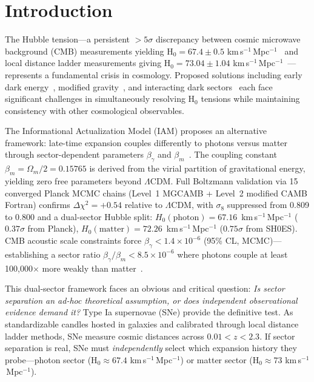 \documentclass[twocolumn,superscriptaddress,prd,amsmath,amssymb]{revtex4-2}
\begin{document}
\section{Introduction}

The Hubble tension—a persistent $>5\sigma$ discrepancy between cosmic microwave background (CMB) measurements yielding H$_0 = 67.4 \pm 0.5$ km\,s$^{-1}$\,Mpc$^{-1}$~\cite{PlanckCollaboration2020} and local distance ladder measurements giving H$_0 = 73.04 \pm 1.04$ km\,s$^{-1}$\,Mpc$^{-1}$~\cite{Riess2022}—represents a fundamental crisis in cosmology. Proposed solutions including early dark energy~\cite{Kamionkowski2023}, modified gravity~\cite{Amendola2020}, and interacting dark sectors~\cite{DiValentino2021} each face significant challenges in simultaneously resolving H$_0$ tensions while maintaining consistency with other cosmological observables.

The Informational Actualization Model (IAM) proposes an alternative framework: late-time expansion couples differently to photons versus matter through sector-dependent parameters $\beta_\gamma$ and $\beta_m$~\cite{IAMManuscript2025}. The coupling constant $\beta_m = \Omega_m/2 = 0.15765$ is derived from the virial partition of gravitational energy, yielding zero free parameters beyond $\Lambda$CDM. Full Boltzmann validation via 15 converged Planck MCMC chains (Level~1 MGCAMB + Level~2 modified CAMB Fortran) confirms $\Delta\chi^2 = +0.54$ relative to $\Lambda$CDM, with $\sigma_8$ suppressed from 0.809 to 0.800 and a dual-sector Hubble split: $H_0(\mathrm{photon}) = 67.16$~km\,s$^{-1}$\,Mpc$^{-1}$ ($0.37\sigma$ from Planck), $H_0(\mathrm{matter}) = 72.26$~km\,s$^{-1}$\,Mpc$^{-1}$ ($0.75\sigma$ from SH0ES). CMB acoustic scale constraints force $\beta_\gamma < 1.4 \times 10^{-6}$ (95\% CL, MCMC)---establishing a sector ratio $\beta_\gamma/\beta_m < 8.5 \times 10^{-6}$ where photons couple at least 100,000$\times$ more weakly than matter~\cite{IAMCompendium2025}.

This dual-sector framework faces an obvious and critical question: \textit{Is sector separation an ad-hoc theoretical assumption, or does independent observational evidence demand it?} Type Ia supernovae (SNe) provide the definitive test. As standardizable candles hosted in galaxies and calibrated through local distance ladder methods, SNe measure cosmic distances across $0.01 < z < 2.3$. If sector separation is real, SNe must \textit{independently} select which expansion history they probe—photon sector (H$_0 \approx 67.4$ km\,s$^{-1}$\,Mpc$^{-1}$) or matter sector (H$_0 \approx 73$ km\,s$^{-1}$\,Mpc$^{-1}$).
\end{document}
